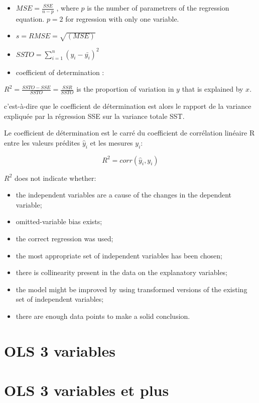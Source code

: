 \documentclass[
]{report}
\providecommand{\tightlist}{%
  \setlength{\itemsep}{0pt}\setlength{\parskip}{0pt}}
\begin{document}
\begin{itemize}
\item
  \(MSE = \frac{SSE}{n-p}\) , where \(p\) is the number of parametrers of the regression equation. \(p=2\) for regression with only one variable.
\item
  \(s = RMSE = \sqrt{(MSE)}\)
\item
  \(SSTO=\sum_{i=1}^n (y_i -\bar{y_i})^2\)
\item
  coefficient of determination :
\end{itemize}

\(R^2 = \frac{SSTO-SSE}{SSTO} = \frac{SSR}{SSTO}\) is the proportion of variation in \(y\) that is explained by \(x\).

c'est-à-dire que le coefficient de détermination est alors le rapport de la variance expliquée par la régression SSE sur la variance totale SST.

Le coefficient de détermination est le carré du coefficient de corrélation linéaire R entre les valeurs prédites \(\hat{y}_{i}\) et les mesures \(y_i\):

\[R^2=corr(\hat{y}_{i},y_i)\]

\(R^2\) does not indicate whether:

\begin{itemize}
\tightlist
\item
  the independent variables are a cause of the changes in the dependent variable;
\item
  omitted-variable bias exists;
\item
  the correct regression was used;
\item
  the most appropriate set of independent variables has been chosen;
\item
  there is collinearity present in the data on the explanatory variables;
\item
  the model might be improved by using transformed versions of the existing set of independent variables;
\item
  there are enough data points to make a solid conclusion.
\end{itemize}

\hypertarget{ols-3-variables}{%
\section{OLS 3 variables}\label{ols-3-variables}}

\hypertarget{ols-3-variables-et-plus}{%
\section{OLS 3 variables et plus}\label{ols-3-variables-et-plus}}
\end{document}

